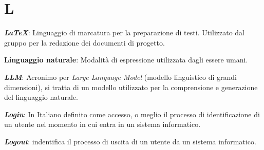 \documentclass[5pt]{article}
\begin{document}
\pagebreak

\section*{L}
\begin{flushleft}
	
\textbf{\textit{LaTeX}}: Linguaggio di marcatura per la preparazione di testi. Utilizzato dal gruppo per la redazione dei documenti di progetto.\newline
	
\textbf{Linguaggio naturale}: Modalità di espressione utilizzata dagli essere umani.\newline

\textbf{\textit{LLM}}: Acronimo per \textit{Large Language Model} (modello linguistico di grandi dimensioni), si tratta di un modello utilizzato per la comprensione e generazione del linguaggio naturale.\newline

\textbf{\textit{Login}}: In Italiano definito come accesso, o meglio il processo di identificazione di un utente nel momento in cui entra in un sistema informatico. \newline

\textbf{\textit{Logout}}: indentifica il processo di uscita di un utente da un sistema informatico.

\end{flushleft}

\pagebreak
\end{document}
